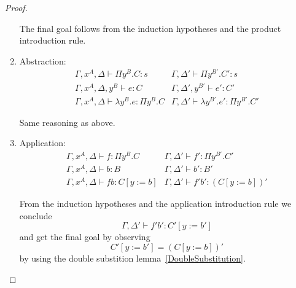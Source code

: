 \begin{theorem}
\begin{proof}
\begin{enumerate}
                The final goal follows from the induction hypotheses and the
                product introduction rule.

            \item Abstraction:
                $$
                \begin{array}{l|l}
                    \Gamma, x^A, \Delta \vdash \Pi y^B. C: s
                    &
                    \Gamma, \Delta' \vdash \Pi y^{B'}. C': s
                    \\
                    \Gamma, x^A, \Delta, y^B \vdash e: C
                    &
                    \Gamma, \Delta', y^{B'} \vdash e': C'
                    \\
                    \hline
                    \Gamma, x^A, \Delta \vdash \lambda y^B. e: \Pi y^B. C
                    &
                    \Gamma, \Delta' \vdash \lambda y^{B'}. e' : \Pi y^{B'}. C'
                \end{array}
                $$

                Same reasoning as above.

            \item Application:
                $$
                \begin{array}{l|l}
                    \Gamma, x^A, \Delta \vdash f: \Pi y^B. C
                    &
                    \Gamma, \Delta' \vdash f' : \Pi y^{B'}. C'
                    \\
                    \Gamma, x^A, \Delta \vdash b: B
                    &
                    \Gamma, \Delta' \vdash b': B'
                    \\
                    \hline
                    \Gamma, x^A, \Delta \vdash f b: C[y:=b]
                    &
                    \Gamma, \Delta' \vdash f' b': (C[y:=b])'
                \end{array}
                $$

                From the induction hypotheses and the application introduction
                rule we conclude
                $$
                    \Gamma, \Delta' \vdash f' b': C'[y:=b']
                $$
                and get the final goal by observing
                $$
                    C'[y:=b'] = (C[y:=b])'
                $$
                by using the double substition lemma~\ref{DoubleSubstitution}.


\end{enumerate}
\end{proof}
\end{theorem}
